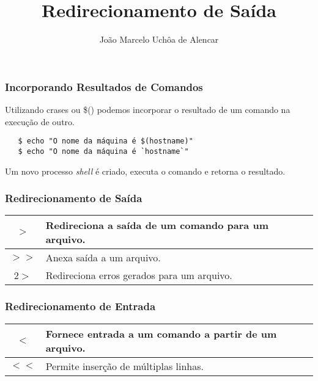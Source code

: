 \documentclass{beamer}
\title{Redirecionamento de Saída}
\author[João Marcelo Uchôa de Alencar]{João Marcelo Uchôa de Alencar}
\institute{Universidade Federal do Ceará - Quixadá}
\begin{document}
   \begin{frame}
      \titlepage
   \end{frame}

\begin{frame}[fragile]
   \frametitle{Incorporando Resultados de Comandos}
   Utilizando crases ou \$() podemos incorporar o resultado de um comando na execução de outro. \\
   \begin{verbatim}
   $ echo "O nome da máquina é $(hostname)" 
   $ echo "O nome da máquina é `hostname`" 
   \end{verbatim}
   Um novo processo \textit{shell} é criado, executa o comando e retorna o resultado.
\end{frame}

   
   \begin{frame}
      \frametitle{Redirecionamento de Saída}
      \begin{table}
         \begin{tabular}{ c | l }
         $>$ & Redireciona a saída de um comando para um arquivo. \\
         \hline 
         $>>$ & Anexa saída a um arquivo. \\
         \hline 
         2$>$ & Redireciona erros gerados para um arquivo. \\
         \hline 
         \end{tabular}
      \end{table}
   \end{frame}

   \begin{frame}
      \frametitle{Redirecionamento de Entrada}
      \begin{table}
         \begin{tabular}{ c | l }
         $<$ & Fornece entrada a um comando a partir de um arquivo. \\
         \hline 
         $<<$ & Permite inserção de múltiplas linhas. \\
         \hline 
         \end{tabular}
      \end{table}
   \end{frame}
\end{document}
